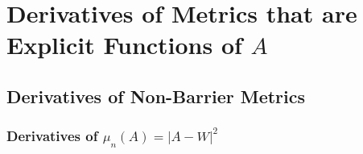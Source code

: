\documentclass{report}
\begin{document}
         

\chapter{Derivatives of Metrics that are Explicit Functions of $A$}

\section{Derivatives of Non-Barrier Metrics}

\subsection{\label{diff} Derivatives of $\mu_n(A)=|A-W|^2$}
\end{document}

